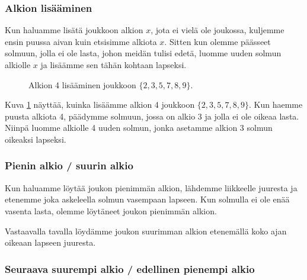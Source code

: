 \subsubsection{Alkion lisääminen}

Kun haluamme lisätä joukkoon alkion $x$,
jota ei vielä ole joukossa, kuljemme ensin
puussa aivan kuin etsisimme alkiota $x$.
Sitten kun olemme päässeet solmuun,
jolla ei ole lasta, johon meidän tulisi edetä,
luomme uuden solmun alkiolle $x$ ja lisäämme
sen tähän kohtaan lapseksi.

\begin{figure}
\center
{}
\caption{Alkion 4 lisääminen joukkoon $\{2,3,5,7,8,9\}$.}
\label{fig:bihpu2}
\end{figure}

Kuva \ref{fig:bihpu2} näyttää, kuinka lisäämme alkion 4
joukkoon $\{2,3,5,7,8,9\}$.
Kun haemme puusta alkiota 4, päädymme solmuun,
jossa on alkio 3 ja jolla ei ole oikeaa lasta.
Niinpä luomme alkiolle 4 uuden solmun, jonka asetamme
alkion 3 solmun oikeaksi lapseksi.

\subsubsection{Pienin alkio / suurin alkio}

Kun haluamme löytää joukon pienimmän alkion,
lähdemme liikkeelle juuresta ja etenemme joka askeleella
solmun vasempaan lapseen.
Kun solmulla ei ole enää vasenta lasta,
olemme löytäneet joukon pienimmän alkion.

Vastaavalla tavalla löydämme joukon suurimman alkion
etenemällä koko ajan oikeaan lapseen juuresta.

\subsubsection{Seuraava suurempi alkio / edellinen pienempi alkio}

